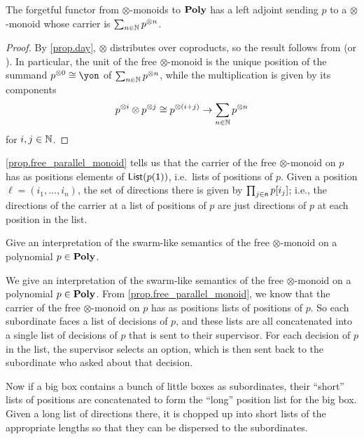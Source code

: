 \documentclass[Book-Poly]{subfiles}
\begin{document}
\begin{proposition} \label{prop.free_parallel_monoid}
The forgetful functor from $\otimes$-monoids to $\mathbf{Poly}$ has a left adjoint sending $p$ to a $\otimes$-monoid whose carrier is $\sum_{n \in \mathbb{N}} p^{\otimes n}$.
\end{proposition}
\begin{proof}
By \cref{prop.day}, $\otimes$ distributes over coproducts, so the result follows from \cite[Chapter~VII, Theorem~2]{MacLane:1998a} (or \cite[Proposition~2.2]{Nlab:category_of_monoids}).
In particular, the unit of the free $\otimes$-monoid is the unique position of the summand $p^{\otimes 0} \iso \yon$ of $\sum_{n \in \mathbb{N}} p^{\otimes n}$, while the multiplication is given by its components
\[
    p^{\otimes i} \otimes p^{\otimes j} \cong p^{\otimes (i + j)} \to \sum_{n \in \mathbb{N}} p^{\otimes n}
\]
for $i, j \in \mathbb{N}$.
\end{proof}

\cref{prop.free_parallel_monoid} tells us that the carrier of the free $\otimes$-monoid on $p$ has as positions elements of $\mathsf{List}(p(\textsf{1}))$, i.e.\ lists of positions of $p$.
Given a position $\ell=(i_1,\ldots,i_n)$, the set of directions there is given by $\prod_{j\in\mathsf{n}} p[i_j]$; i.e., the directions of the carrier at a list of positions of $p$ are just directions of $p$ at each position in the list.

\begin{exercise}
Give an interpretation of the swarm-like semantics of the free $\otimes$-monoid on a polynomial $p\in\mathbf{Poly}$.
\begin{solution}
We give an interpretation of the swarm-like semantics of the free $\otimes$-monoid on a polynomial $p\in\mathbf{Poly}$.
From \cref{prop.free_parallel_monoid}, we know that the carrier of the free $\otimes$-monoid on $p$ has as positions lists of positions of $p$.
So each subordinate faces a list of decisions of $p$, and these lists are all concatenated into a single list of decisions of $p$ that is sent to their supervisor.
For each decision of $p$ in the list, the supervisor selects an option, which is then sent back to the subordinate who asked about that decision.


Now if a big box contains a bunch of little boxes as subordinates, their ``short'' lists of positions are concatenated to form the ``long'' position list for the big box. Given a long list of directions there, it is chopped up into short lists of the appropriate lengths so that they can be dispersed to the subordinates.
\end{solution}
\end{exercise}
\end{document}
